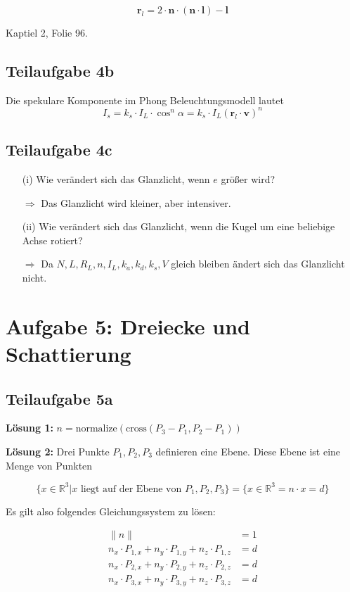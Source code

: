 \documentclass[a4paper]{scrartcl}
\begin{document}
\[\mathbf{r}_l = 2 \cdot \mathbf{n} \cdot (\mathbf{n} \cdot \mathbf{l}) - \mathbf{l}\]

Kaptiel 2, Folie 96.


\subsection*{Teilaufgabe 4b}
Die spekulare Komponente im Phong Beleuchtungsmodell lautet
\[I_s = k_s \cdot I_L \cdot \cos^n \alpha = k_s \cdot I_L (\mathbf{r}_l \cdot \mathbf{v})^n\]

\subsection*{Teilaufgabe 4c}
\begin{enumerate}
    \item[(i)] Wie verändert sich das Glanzlicht, wenn $e$ größer wird?
    \item[$\Rightarrow$] Das Glanzlicht wird kleiner, aber intensiver.
    \item[(ii)] Wie verändert sich das Glanzlicht, wenn die Kugel um eine beliebige Achse rotiert?
    \item[$\Rightarrow$] Da $N,L, R_L, n, I_L, k_a, k_d, k_s, V$ gleich bleiben ändert sich das Glanzlicht nicht.
\end{enumerate}


\section*{Aufgabe 5: Dreiecke und Schattierung}
\subsection*{Teilaufgabe 5a}
\textbf{Lösung 1:} $n = \text{normalize}(\text{cross}(P_3-P_1,P_2-P_1))$

\textbf{Lösung 2:}
Drei Punkte $P_1, P_2, P_3$ definieren eine Ebene. Diese Ebene ist eine Menge
von Punkten

\[\{x \in \mathbb{R}^3 | x \text{ liegt auf der Ebene von } P_1, P_2, P_3\} = \{x \in \mathbb{R}^3 = n \cdot x = d\}\]

Es gilt also folgendes Gleichungssystem zu lösen:

\begin{align}
    \|n\| &= 1\\
    n_x \cdot P_{1, x} + n_y \cdot P_{1, y} + n_z \cdot P_{1, z} &= d\\
    n_x \cdot P_{2, x} + n_y \cdot P_{2, y} + n_z \cdot P_{2, z} &= d\\
    n_x \cdot P_{3, x} + n_y \cdot P_{3, y} + n_z \cdot P_{3, z} &= d
\end{align}
\end{document}
